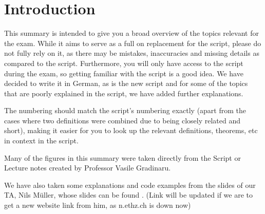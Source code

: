 \documentclass{article}
\begin{document}
\newpage
{}



\newpage
\setcounter{section}{-1}
\section{Introduction}
This summary is intended to give you a broad overview of the topics relevant for the exam.
While it aims to serve as a full on replacement for the script, please do not fully rely on it, as there may be mistakes, inaccuracies and missing details as compared to the script.
Furthermore, you will only have access to the script during the exam, so getting familiar with the script is a good idea.
We have decided to write it in German, as is the new script and for some of the topics that are poorly explained in the script, we have added further explanations.

The numbering should match the script's numbering exactly (apart from the cases where two definitions were combined due to being closely related and short),
making it easier for you to look up the relevant definitions, theorems, etc in context in the script.

Many of the figures in this summary were taken directly from the Script or Lecture notes created by Professor Vasile Gradinaru.

We have also taken some explanations and code examples from the slides of our TA, Nils Müller, whose slides can be found
. (Link will be updated if we are to get a new website link from him, as n.ethz.ch is down now)
\end{document}
